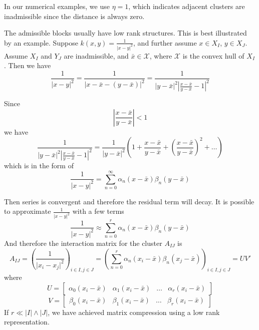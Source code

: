 \documentclass[10pt,a4paper]{article}
\theoremstyle{definition}
\begin{document}
In our numerical examples, we use $\eta=1$, which indicates adjacent clusters are inadmissible since the distance is always zero. 

The admissible blocks usually have low rank structures. This is best illustrated by an example. Suppose $k(x,y)=\frac{1}{|x-y|^2}$, and further assume $x\in X_I$, $y\in X_J$. Assume $X_I$ and $Y_J$ are inadmissible, and $\bar x\in \mathcal{X}$, where $\mathcal{X}$ is the convex hull of $X_I$. Then we have
\[\frac{1}{{|x - y{|^2}}} = \frac{1}{{|x - \bar x - (y - \bar x){|^2}}} = \frac{1}{{|y - \bar x{|^2}{{\left| {\frac{{x - \bar x}}{{y - \bar x}} - 1} \right|}^2}}}\]

Since 
\[\left| {\frac{{x - \bar x}}{{y - \bar x}}} \right| < 1\]
we have 
\[\frac{1}{{|y - \bar x{|^2}{{\left| {\frac{{x - \bar x}}{{y - \bar x}} - 1} \right|}^2}}} = \frac{1}{{|y - \bar x{|^2}}}\left( {1 + \frac{{x - \bar x}}{{y - \bar x}} + {{\left( {\frac{{x - \bar x}}{{y - \bar x}}} \right)}^2} +  \ldots } \right)\]
which is in the form of 
\begin{equation}
	\frac{1}{{|x - y{|^2}}} = \sum_{n=0}^\infty \alpha_n(x-\bar x)\beta_n(y-\bar x)
\end{equation}

Then series is convergent and therefore the residual term will decay. It is possible to approximate $\frac{1}{{|x - y{|^2}}}$ with a few terms
\begin{equation}
	\frac{1}{{|x - y{|^2}}} \approx \sum_{n=0}^r \alpha_n(x-\bar x)\beta_n(y-\bar x)
\end{equation}
And therefore the interaction matrix for the cluster $A_{IJ}$ is 
\begin{equation}
	A_{IJ} = \left(\frac{1}{{|x_i - x_j{|^2}}}\right)_{i\in I, j\in J} =\left( \sum_{n=0}^r \alpha_n(x_i-\bar x)\beta_n(x_j-\bar x)\right)_{i\in I, j\in J} = UV'
\end{equation}
where
\begin{equation}
	U = \begin{bmatrix}
		\alpha_0(x_i-\bar x)& \alpha_1(x_i-\bar x)&\ldots & \alpha_r(x_i-\bar x)
	\end{bmatrix}
\end{equation}
\begin{equation}
	V = \begin{bmatrix}
		\beta_0(x_i-\bar x)& \beta_1(x_i-\bar x)&\ldots & \beta_r(x_i-\bar x)
	\end{bmatrix}
\end{equation}
If $r\ll |I|\wedge |J|$, we have achieved matrix compression using a low rank representation. 
\end{document}
